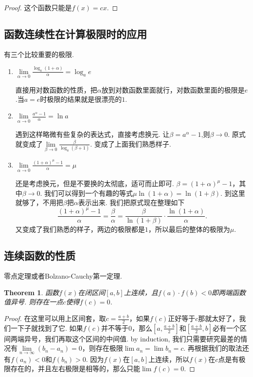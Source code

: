 \documentclass{article}
\newtheorem{theorem}{Theorem}[section]
\begin{document}
\begin{proof}
这个函数只能是$f(x)=cx$.
\end{proof}

\newpage
\subsection{函数连续性在计算极限时的应用}

有三个比较重要的极限.

\begin{enumerate}
	\item $\lim\limits_{\alpha \rightarrow 0} \frac{\log_a(1+\alpha)}{\alpha} = \log_a e$

直接用对数函数的性质，把$\alpha$放到对数函数里面就行，对数函数里面的极限是$e$.当$a=e$时极限的结果就是很漂亮的$1$.			
	
	\item $\lim\limits_{\alpha \rightarrow 0} \frac{a^\alpha-1}{\alpha} = \ln a$
	
遇到这样略微有些复杂的表达式，直接考虑换元. 让$\beta = a^\alpha -1$,则$\beta \rightarrow 0$. 原式就变成了$\lim\limits_{\beta \rightarrow 0} \frac{\beta}{\log_a(\beta+1)}$. 变成了上面我们熟悉样子.	
	
	\item $\lim\limits_{\alpha \rightarrow 0} \frac{(1+\alpha)^\mu-1}{\alpha} = \mu$
	
还是考虑换元，但是不要换的太彻底，适可而止即可. $\beta = (1+\alpha)^\mu - 1$，其中$\beta \rightarrow 0$. 我们可以得到一个有趣的等式$\mu \ln(1+\alpha) = \ln(1+\beta)$. 到这里就够了，不用把$\beta$把$\alpha$表示出来. 我们把原式现在整理如下\[\frac{(1+\alpha)^\mu-1}{\alpha} = \frac{\beta}{\alpha} = \frac{\beta}{\ln(1+\beta)}\cdot\frac{\ln(1+\alpha)}{\alpha}.\]又变成了我们熟悉的样子，两边的极限都是$1$，所以最后的整体的极限为$\mu$.	
\end{enumerate}

\newpage
\subsection{连续函数的性质}

零点定理或者Bolzano-Cauchy第一定理.
\begin{theorem}
函数$f(x)$在闭区间$[a,b]$上连续，且$f(a) \cdot f(b) < 0$即两端函数值异号. 则存在一点$c$使得$f(c)=0$.
\end{theorem}

\begin{proof}
在这里可以用上区间套，取$c =\frac{a+b}{2}$，如果$f(c)$正好等于$c$那就太好了，我们一下子就找到了它. 如果$f(c)$并不等于$0$，那么$[a,\frac{a+b}{2}]$和$[\frac{a+b}{2},b]$必有一个区间两端异号，我们再取这个区间的中间值. by induction, 我们只需要研究最差的情况有$\lim\limits_{n \rightarrow \infty}(b_n - a_n)=0$，则存在极限$\lim a_n = \lim b_n = c$. 再根据我们的取法还有$f(a_n) < 0$和$f(b_n) > 0$. 因为$f(x)$在$[a,b]$上连续，所以$f(x)$在$c$点是有极限存在的，并且左右极限是相等的，那么只能$\lim f(c) = 0$.
\end{proof} 
\end{document}
